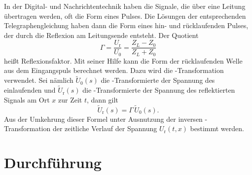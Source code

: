 In der Digital- und Nachrichtentechnik haben die Signale, die
über eine Leitung übertragen werden, oft die Form eines Pulses.
Die Lösungen der entsprechenden Telegraphengleichung haben dann
die Form eines hin- und rücklaufenden Pulses, der durch die
Reflexion am Leitungsende entsteht.  Der Quotient
%
\begin{equation}
\Gamma = \frac{U_\text{r}}{U_0} = \frac{Z_L - Z_0}{Z_L + Z_0}
\end{equation}
%
heißt Reflexionsfaktor.  Mit seiner Hilfe kann die Form der
rücklaufenden Welle aus dem Eingangspuls berechnet werden.  Dazu
wird die -Transformation verwendet.  Sei nämlich
$\tilde{U}_0(s)$ die -Transformierte der Spannung
des einlaufenden und $\tilde{U}_\text{r}(s)$
die -Transformierte der Spannung des reflektierten
Signals am Ort $x$ zur Zeit $t$, dann gilt
%
\begin{equation}
\tilde{U}_\text{r}(s) = \Gamma\, \tilde{U}_0(s).
\end{equation}
%
Aus der Umkehrung dieser Formel unter Ausnutzung der
inversen -Transformation der zeitliche Verlauf der
Spannung $U_\text{r}(t, x)$ bestimmt werden.

\section{Durchführung}


